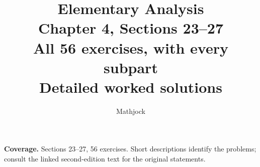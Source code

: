 
\title{\textbf{Elementary Analysis}\\[0.3em]
Chapter 4, Sections 23--27\\[0.4em]
\large All 56 exercises, with every subpart\\
Detailed worked solutions}
\author{Mathjock}
\date{}

\maketitle
\bookinfo
\par\textbf{Coverage.} Sections 23--27, 56 exercises. Short descriptions identify the problems; consult the linked second-edition text for the original statements.
\tableofcontents
\clearpage
\setcounter{section}{22}

\clearpage

\clearpage

\clearpage

\clearpage


